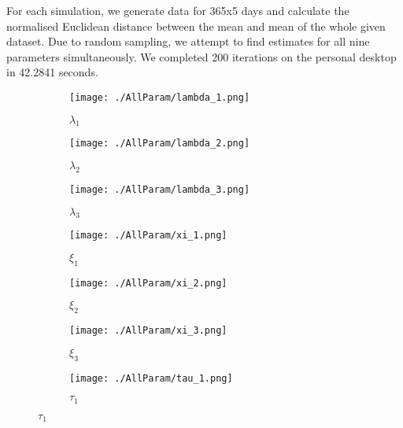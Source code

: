         For each simulation, we generate data for 365x5 days and calculate the normalised Euclidean distance between the mean and mean of the whole given dataset. Due to random sampling, we attempt to find estimates for all nine parameters simultaneously. We completed 200 iterations on the personal desktop in 42.2841 seconds.


        \begin{figure}
            \centering
            \begin{subfigure}{.3\textwidth}
                \centering
                \texttt{[image: ./AllParam/lambda\_1.png]}
                \caption{$\lambda_1$ }
                \label{allp:lambda1}
            \end{subfigure}
            \begin{subfigure}{.3\textwidth}
                \centering
                \texttt{[image: ./AllParam/lambda\_2.png]}
                \caption{$\lambda_2$ }
                \label{allp:lambda2}
            \end{subfigure}    
            \begin{subfigure}{.3\textwidth}
                \centering
                \texttt{[image: ./AllParam/lambda\_3.png]}
                \caption{$\lambda_3$ }
                \label{allp:lambda3}
            \end{subfigure}
            \begin{subfigure}{.3\textwidth} 
                \centering
                \texttt{[image: ./AllParam/xi\_1.png]}
                \caption{$\xi_1$ }
                \label{allp:xi1}
            \end{subfigure}
            \begin{subfigure}{.3\textwidth}
                \centering
                \texttt{[image: ./AllParam/xi\_2.png]}
                \caption{$\xi_2$ }
                \label{allp:xi2}
            \end{subfigure}
            \begin{subfigure}{.3\textwidth}
                \centering
                \texttt{[image: ./AllParam/xi\_3.png]}
                \caption{$\xi_3$ }
                \label{allp:xi3}
            \end{subfigure}
            \begin{subfigure}{.3\textwidth}
                \centering
                \texttt{[image: ./AllParam/tau\_1.png]}
                \caption{$\tau_1$ }

\end{subfigure}
\end{figure}
